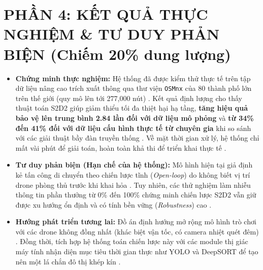 \documentclass[../main.tex]{subfiles}
\begin{document}

\section{PHẦN 4: KẾT QUẢ THỰC NGHIỆM \& TƯ DUY PHẢN BIỆN (Chiếm 20\% dung lượng)}

\begin{itemize}
    \item \textbf{Chứng minh thực nghiệm:} Hệ thống đã được kiểm thử thực tế trên tập dữ liệu nâng cao trích xuất thông qua thư viện \texttt{OSMnx} \cite{boeing2017osmnx} của 80 thành phố lớn trên thế giới (quy mô lên tới 277,000 nút) \cite{mutzari2025defending}. Kết quả định lượng cho thấy thuật toán S2D2 giúp giảm thiểu tối đa thiệt hại hạ tầng, \textbf{tăng hiệu quả bảo vệ lên trung bình 2.84 lần đối với dữ liệu mô phỏng} và \textbf{từ 34\% đến 41\% đối với dữ liệu cấu hình thực tế từ chuyên gia} khi so sánh với các giải thuật bầy đàn truyền thống \cite{mutzari2025defending}. Về mặt thời gian xử lý, hệ thống chỉ mất vài phút để giải toán, hoàn toàn khả thi để triển khai thực tế \cite{mutzari2025defending}.
    \item \textbf{Tư duy phản biện (Hạn chế của hệ thống):} Mô hình hiện tại giả định kẻ tấn công di chuyển theo chiến lược tĩnh (\textit{Open-loop}) do không biết vị trí drone phòng thủ trước khi khai hỏa \cite{mutzari2025defending}. Tuy nhiên, các thử nghiệm làm nhiễu thông tin phần thưởng từ 0\% đến 100\% chứng minh chiến lược S2D2 vẫn giữ được xu hướng ổn định và có tính bền vững (\textit{Robustness}) cao \cite{mutzari2025defending}.
    \item \textbf{Hướng phát triển tương lai:} Đồ án định hướng mở rộng mô hình trò chơi với các drone không đồng nhất (khác biệt vận tốc, có camera nhiệt quét đêm) \cite{mutzari2025defending}. Đồng thời, tích hợp hệ thống toán chiến lược này với các module thị giác máy tính nhận diện mục tiêu thời gian thực như YOLO và DeepSORT để tạo nên một lá chắn đô thị khép kín \cite{mutzari2025defending}.
\end{itemize}
\end{document}
